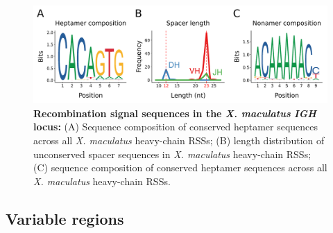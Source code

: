 		\begin{figure}
	\includegraphics[width=\textwidth]{_Figures/png/xma-rss-seqlogo-all}
	\caption[Recombination signal sequences in the \textit{X. maculatus} \textit{IGH} locus]{\textbf{Recombination signal sequences in the \textit{X. maculatus} \textit{IGH} locus:} (A) Sequence composition of conserved heptamer sequences across all \textit{X. maculatus} heavy-chain RSSs; (B) length distribution of unconserved spacer sequences in \textit{X. maculatus} heavy-chain RSSs; (C) sequence composition of conserved heptamer sequences across all \textit{X. maculatus} heavy-chain RSSs.}
	\label{fig:nfu-rss-seqlogo-all}
	\end{figure} %

	


	\subsection{Variable regions}
	
